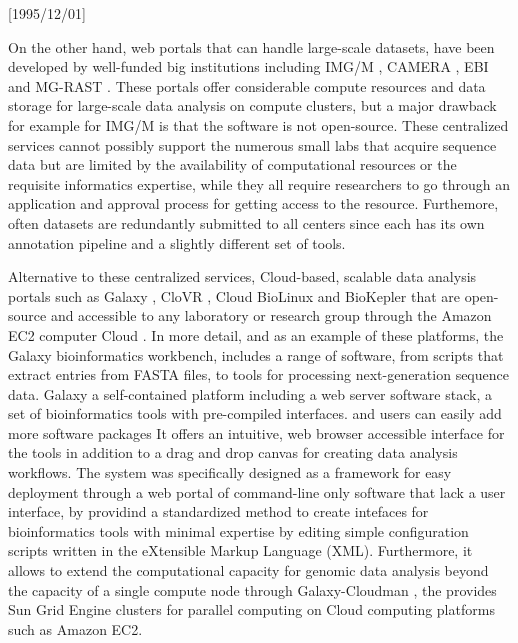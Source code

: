 \NeedsTeXFormat{LaTeX2e}[1995/12/01] \documentclass[10pt]{bmc_article}
\newenvironment{bmcformat}{\begin{raggedright}\baselineskip20pt\sloppy\setboolean{publ}{false}}{\end{raggedright}\baselineskip20pt\sloppy}
\begin{document}
\begin{bmcformat}
On the other hand, web portals that can handle large-scale datasets, have been developed by well-funded
big institutions including IMG/M \cite{Grigoriev2012}, CAMERA \cite{Altintas2010}, EBI \cite{Hunter2011} 
and MG-RAST \cite{Aziz2010}. These portals offer considerable compute resources and data storage for 
large-scale data analysis on compute clusters, but a major drawback for example for IMG/M is that the 
software is not open-source. These centralized services cannot possibly support the numerous 
small labs that acquire sequence data but are limited by the availability of computational resources or 
the requisite informatics expertise, while they all require researchers to go through an application and
approval process for getting access to the resource. Furthemore, often datasets are redundantly submitted 
to all centers since each has its own annotation pipeline and a slightly different set of tools.  

Alternative to these centralized services, Cloud-based, scalable data analysis portals such as Galaxy
\cite{Goecks2010}, CloVR \cite{Angiuoli2011}, Cloud BioLinux \cite{Krampis2012} and BioKepler \cite{Altintas2011} 
that are open-source and accessible to any laboratory or research group through the Amazon EC2 computer Cloud 
\cite{awsec2}. In more detail, and as an example of these platforms, the Galaxy bioinformatics workbench, 
includes a range of software, from scripts that extract entries from FASTA files, to tools for processing 
next-generation sequence data. Galaxy a self-contained platform including a web server software stack, a set 
of bioinformatics tools with pre-compiled interfaces. and users can easily add more software packages 
It offers an intuitive, web browser accessible interface for the tools in addition to a drag and drop canvas 
for creating data analysis workflows. The system was specifically designed as a framework for easy deployment 
through a web portal of command-line only software that lack a user interface, by providind a standardized method 
to create intefaces for bioinformatics tools with minimal expertise by editing simple configuration scripts written 
in the eXtensible Markup Language (XML). Furthermore, it allows to extend the computational capacity for genomic data
analysis beyond the capacity of a single compute node through Galaxy-Cloudman \cite{Afgan2010}, the provides Sun 
Grid Engine clusters for parallel computing on Cloud computing platforms such as Amazon EC2.


\end{bmcformat}
\end{document}
